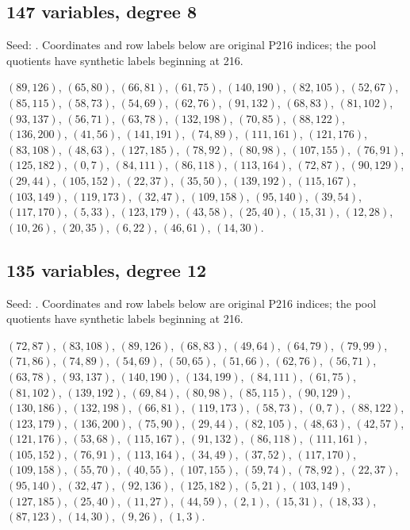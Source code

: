 \documentclass[11pt]{article}
\theoremstyle{definition}\newtheorem{definition}[theorem]{Definition}
\newcommand{\code}[1]{\texttt{\detokenize{#1}}}
\begin{document}
\subsection*{147 variables, degree 8}
Seed: \code{source211.json}. Coordinates and row labels below are original P216 indices; the pool quotients have synthetic labels beginning at 216.
{\small\raggedright
$(89,126)$, $(65,80)$, $(66,81)$, $(61,75)$, $(140,190)$, $(82,105)$, $(52,67)$, $(85,115)$, $(58,73)$, $(54,69)$, $(62,76)$, $(91,132)$, $(68,83)$, $(81,102)$, $(93,137)$, $(56,71)$, $(63,78)$, $(132,198)$, $(70,85)$, $(88,122)$, $(136,200)$, $(41,56)$, $(141,191)$, $(74,89)$, $(111,161)$, $(121,176)$, $(83,108)$, $(48,63)$, $(127,185)$, $(78,92)$, $(80,98)$, $(107,155)$, $(76,91)$, $(125,182)$, $(0,7)$, $(84,111)$, $(86,118)$, $(113,164)$, $(72,87)$, $(90,129)$, $(29,44)$, $(105,152)$, $(22,37)$, $(35,50)$, $(139,192)$, $(115,167)$, $(103,149)$, $(119,173)$, $(32,47)$, $(109,158)$, $(95,140)$, $(39,54)$, $(117,170)$, $(5,33)$, $(123,179)$, $(43,58)$, $(25,40)$, $(15,31)$, $(12,28)$, $(10,26)$, $(20,35)$, $(6,22)$, $(46,61)$, $(14,30)$.\par}

\subsection*{135 variables, degree 12}
Seed: \code{source211.json}. Coordinates and row labels below are original P216 indices; the pool quotients have synthetic labels beginning at 216.
{\small\raggedright
$(72,87)$, $(83,108)$, $(89,126)$, $(68,83)$, $(49,64)$, $(64,79)$, $(79,99)$, $(71,86)$, $(74,89)$, $(54,69)$, $(50,65)$, $(51,66)$, $(62,76)$, $(56,71)$, $(63,78)$, $(93,137)$, $(140,190)$, $(134,199)$, $(84,111)$, $(61,75)$, $(81,102)$, $(139,192)$, $(69,84)$, $(80,98)$, $(85,115)$, $(90,129)$, $(130,186)$, $(132,198)$, $(66,81)$, $(119,173)$, $(58,73)$, $(0,7)$, $(88,122)$, $(123,179)$, $(136,200)$, $(75,90)$, $(29,44)$, $(82,105)$, $(48,63)$, $(42,57)$, $(121,176)$, $(53,68)$, $(115,167)$, $(91,132)$, $(86,118)$, $(111,161)$, $(105,152)$, $(76,91)$, $(113,164)$, $(34,49)$, $(37,52)$, $(117,170)$, $(109,158)$, $(55,70)$, $(40,55)$, $(107,155)$, $(59,74)$, $(78,92)$, $(22,37)$, $(95,140)$, $(32,47)$, $(92,136)$, $(125,182)$, $(5,21)$, $(103,149)$, $(127,185)$, $(25,40)$, $(11,27)$, $(44,59)$, $(2,1)$, $(15,31)$, $(18,33)$, $(87,123)$, $(14,30)$, $(9,26)$, $(1,3)$.\par}
\end{document}
